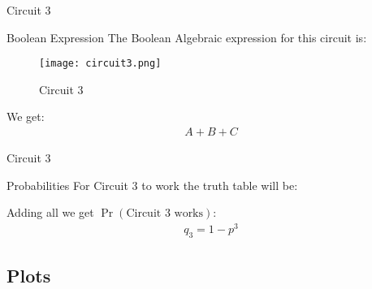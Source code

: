 \documentclass{beamer}
\providecommand{\pr}[1]{\ensuremath{\Pr\left(#1\right)}}
\begin{document}
\begin{frame}{Circuit 3}
\begin{block}{Boolean Expression}
    The Boolean Algebraic expression for this circuit is:
    \begin{figure}
        \centering
        \texttt{[image: circuit3.png]}
        \caption{Circuit 3}
        \label{cir2_label}
    \end{figure}
    We get:
    \begin{align}
        A + B + C
    \end{align}
\end{block}
    
\end{frame}
\begin{frame}{Circuit 3}
\begin{block}{Probabilities}
    For Circuit 3 to work the truth table will be:
    \begin{table}[h]
    \centering
    \caption{Circuit 3 working}
    \label{tab:table3}
\end{table}
    Adding all we get $\pr{\text{Circuit 3 works}}$:
    \begin{align}
    q_3 = 1-p^3 \label{q_3_label}
\end{align}
\end{block}
\end{frame}


\subsection{Plots}
\end{document}
